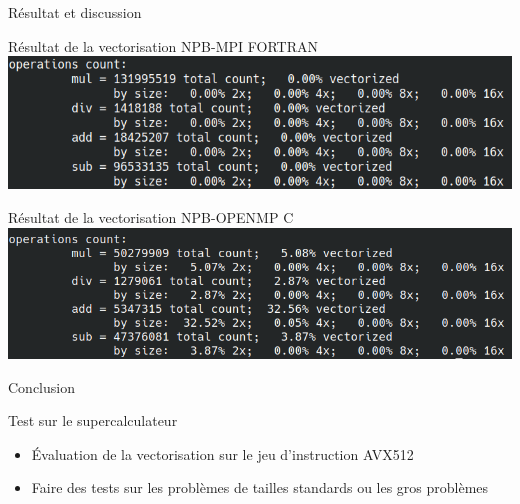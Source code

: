 \documentclass{beamer}
\begin{document}
\begin{frame}{Résultat et discussion}

  \begin{block}{Résultat de la vectorisation NPB-MPI FORTRAN}
    \includegraphics[width=0.6\linewidth]{../ressources/vect1.png}
  \end{block}
  
  \begin{block}{Résultat de la vectorisation NPB-OPENMP C}
    \includegraphics[width=0.6\linewidth]{../ressources/vcopenmp.png}
  \end{block}

\end{frame}

\begin{frame}{ Conclusion}

  \begin{block}{Test sur le supercalculateur}
    \begin{itemize}
    \item Évaluation de la vectorisation sur le jeu d'instruction AVX512
    \item Faire des tests sur les problèmes de tailles standards ou les gros problèmes
    \end{itemize}
  \end{block}
  
\end{frame}
\end{document}
